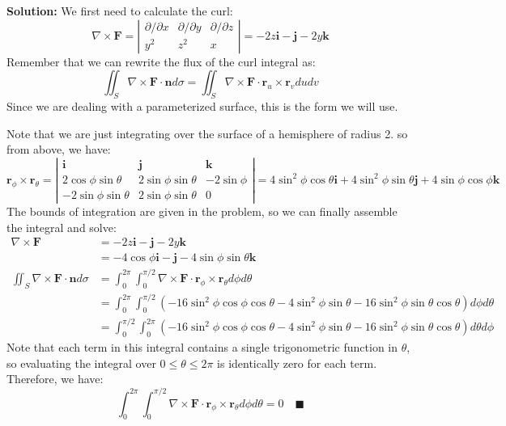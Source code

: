 \documentclass[letterpaper, 11pt]{article}
\begin{document}
\begin{enumerate}
\par \textbf{Solution:} We first need to calculate the curl:
\[ \nabla \times \bm{F} = \left| \begin{array}{ccc} \partial / \partial x & \partial / \partial y & \partial / \partial z \\  y^2 &  z^2  & x \end{array} \right| = - 2z \bm{i} - \bm{j} - 2y \bm{k}  \]
Remember that we can rewrite the flux of the curl integral as:
\[ \iint_S \nabla \times \bm{F} \cdot \bm{n} d\sigma = \iint_S \nabla \times \bm{F} \cdot \bm{r}_u \times \bm{r}_v dudv \]
Since we are dealing with a parameterized surface, this is the form we will use. 
\par Note that we are just integrating over the surface of a hemisphere of radius 2. so from above, we have:
\[ \bm{r}_\phi \times \bm{r}_\theta =\left| \begin{array}{ccc} \bm{i} & \bm{j} & \bm{k}\\ 2 \cos \phi \sin \theta & 2 \sin \phi \sin \theta & - 2 \sin \phi	 \\ -2 \sin \phi \sin \theta & 2 \sin \phi \sin \theta & 0 \end{array} \right| = 4\sin^2 \phi \cos \theta \bm{i} + 4 \sin^2 \phi \sin \theta \bm{j} + 4 \sin \phi \cos \phi \bm{k}  \]
The bounds of integration are given in the problem, so we can finally assemble the integral and solve:
\begin{align*}
\nabla \times \bm{F}  &= - 2z \bm{i} - \bm{j} - 2y \bm{k} \\
&= -4 \cos \phi \bm{i} - \bm{j} - 4\sin \phi \sin\theta \bm{k} \\
 \iint_S \nabla \times \bm{F} \cdot \bm{n} d\sigma &= \int_0^{2\pi} \int_0^{\pi/2} \nabla \times \bm{F} \cdot \bm{r}_\phi \times \bm{r}_\theta d\phi d\theta \\
 &= \int_0^{2\pi} \int_0^{\pi/2} (-16 \sin^2 \phi \cos \phi \cos \theta - 4 \sin^2 \phi \sin \theta - 16 \sin^2 \phi \sin \theta \cos \theta)d \phi d \theta \\
 &= \int_0^{\pi/2} \int_0^{2\pi} (-16 \sin^2 \phi \cos \phi \cos \theta - 4 \sin^2 \phi \sin \theta - 16 \sin^2 \phi \sin \theta \cos \theta) d \theta d \phi 
\end{align*}
Note that each term in this integral contains a single trigonometric function in $\theta$, so evaluating the integral over $0 \leq \theta\leq 2 \pi$ is identically zero for each term. Therefore, we have:
\[ \int_0^{2\pi} \int_0^{\pi/2} \nabla \times \bm{F} \cdot \bm{r}_\phi \times \bm{r}_\theta d\phi d\theta = 0 \quad\blacksquare \]
\end{enumerate}
\end{document}
